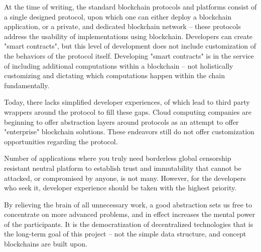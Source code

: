 \documentclass[12pt, titlepage, twocolumn]{report}
\begin{document}
At the time of writing, the standard blockchain protocols and platforms consist of a single designed protocol, upon which one can either deploy a blockchain application, or a private, and dedicated blockchain network -- these protocols address the usability of implementations using blockchain. Developers can create "smart contracts", but this level of development does not include customization of the behaviors of the protocol itself. Developing "smart contracts" is in the service of including additional computations within a blockchain -- not holistically customizing and dictating which computations happen within the chain fundamentally. 

Today, there lacks simplified developer experiences, of which lead to third party wrappers around the protocol to fill these gaps. Cloud computing companies are beginning to offer abstraction layers around protocols as an attempt to offer "enterprise" blockchain solutions. These endeavors still do not offer customization opportunities regarding the protocol.

Number of applications where you truly need borderless global censorship resistant neutral platform to establish trust and immutability that cannot be attacked, or compromised by anyone, is not many. However, for the developers who seek it, developer experience should be taken with the highest priority.

By relieving the brain of all unnecessary work, a good abstraction sets us free to concentrate on more advanced problems, and in effect increases the mental power of the participants. It is the democratization of decentralized technologies that is the long-term goal of this project -- not the simple data structure, and concept blockchains are built upon.
\end{document}
